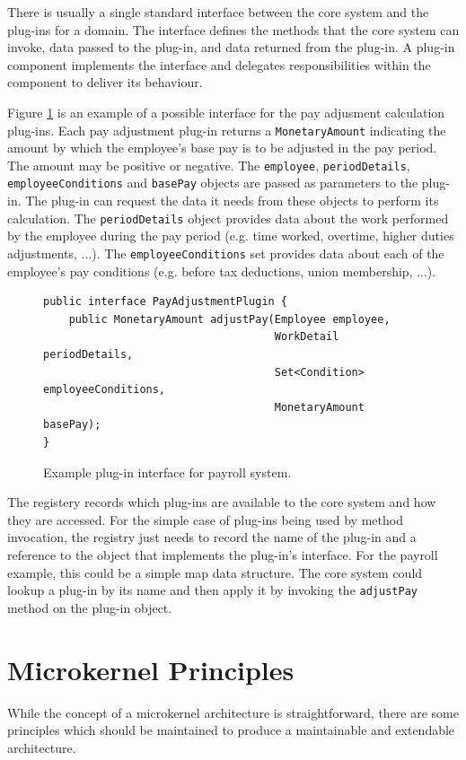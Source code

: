 There is usually a single standard interface between the core system and the plug-ins for a domain.
The interface defines the methods that the core system can invoke, data passed to the plug-in, and data returned from the plug-in.
A plug-in component implements the interface and delegates responsibilities within the component to deliver its behaviour.

Figure \ref{fig:interface} is an example of a possible interface for the pay adjusment calculation plug-ins.
Each pay adjustment plug-in returns a \texttt{MonetaryAmount} indicating the amount by which the employee's base pay is to be adjusted in the pay period.
The amount may be positive or negative.
The \texttt{employee}, \texttt{periodDetails}, \texttt{employeeConditions} and \texttt{basePay} objects are passed as parameters to the plug-in.
The plug-in can request the data it needs from these objects to perform its calculation.
The \texttt{periodDetails} object provides data about the work performed by the employee during the pay period (e.g. time worked, overtime, higher duties adjustments, ...).
The \texttt{employeeConditions} set provides data about each of the employee's pay conditions (e.g. before tax deductions, union membership, ...).

\begin{figure}[h]
\centering
\begin{shaded}
\begin{lstlisting}[style=java]
public interface PayAdjustmentPlugin {
    public MonetaryAmount adjustPay(Employee employee,
                                    WorkDetail periodDetails,
                                    Set<Condition> employeeConditions,
                                    MonetaryAmount basePay);
}
\end{lstlisting}
\end{shaded}
\caption{Example plug-in interface for payroll system.}
\label{fig:interface}
\end{figure}

The registery records which plug-ins are available to the core system and how they are accessed.
For the simple case of plug-ins being used by method invocation,
the registry just needs to record the name of the plug-in and a reference to the object that implements the plug-in's interface.
For the payroll example, this could be a simple map data structure.
The core system could lookup a plug-in by its name and then apply it by invoking the \texttt{adjustPay} method on the plug-in object.

\section{Microkernel Principles}
While the concept of a microkernel architecture is straightforward,
there are some principles which should be maintained to produce a maintainable and extendable architecture.

